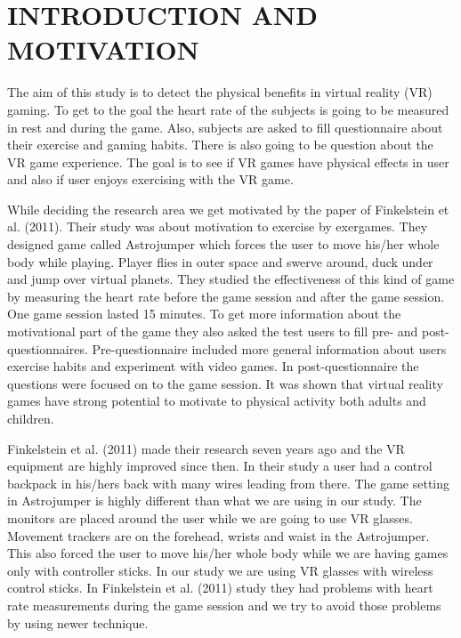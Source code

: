 \documentclass{sig-alternate-05-2015}
\begin{document}


%
%

%
%
\printccsdesc



\section{INTRODUCTION AND MOTIVATION}
The aim of this study is to detect the physical benefits in virtual reality 
(VR) gaming. To get to the goal the heart rate of the subjects is going to 
be measured in rest and during the game. Also, subjects are asked to fill 
questionnaire about their exercise and gaming habits. There is also going 
to be question about the VR game experience. The goal is to see if VR games 
have physical effects in user and also if user enjoys exercising with the 
VR game.

While deciding the research area we get motivated by the paper of Finkelstein 
et al. (2011). Their study was about motivation to exercise by exergames. 
They designed game called Astrojumper which forces the user to move his/her 
whole body while playing. Player flies in outer space and swerve around, 
duck under and jump over virtual planets. They studied the effectiveness 
of this kind of game by measuring the heart rate before the game session 
and after the game session. One game session lasted 15 minutes. To get 
more information about the motivational part of the game they also asked 
the test users to fill pre- and post-questionnaires. Pre-questionnaire 
included more general information about users exercise habits and experiment 
with video games. In post-questionnaire the questions were focused on to 
the game session. It was shown that virtual reality games have strong 
potential to motivate to physical activity both adults and children.

Finkelstein et al. (2011) made their research seven years ago and the VR 
equipment are highly improved since then. In their study a user had a 
control backpack in his/hers back with many wires leading from there. 
The game setting in Astrojumper is highly different than what we are using 
in our study. The monitors are placed around the user while we are going 
to use VR glasses. Movement trackers are on the forehead, wrists and waist 
in the Astrojumper. This also forced the user to move his/her whole body 
while we are having games only with controller sticks. In our study we 
are using VR glasses with wireless control sticks. In Finkelstein et al. 
(2011) study they had problems with heart rate measurements during the game 
session and we try to avoid those problems by using newer technique. 
\end{document}
